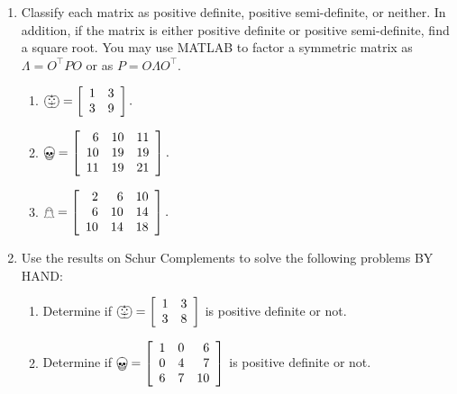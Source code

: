 \documentclass[letterpaper]{article}
\begin{document}
\begin{enumerate}


\item Classify each matrix as positive definite, positive semi-definite, or neither. In addition, if the matrix is either positive definite or positive semi-definite, find a square root. You may use MATLAB to factor a symmetric matrix as $\Lambda = O^\top P O$ or as $P= O \Lambda O ^\top$.

\begin{enumerate}
\setlength{\itemsep}{.1in}
\renewcommand{\labelenumi}{(\alph{enumi})}

\item $\greatpumpkin= \left[ \begin{array}{rr}  1&   3\\  3&   9\end{array} \right].$

\item  $\bigskull= \left[ \begin{array}{rrr}  6&  10&  11\\ 10&  19&  19\\ 11&  19&  21\end{array} \right].$

\item $\mathghost=  \left[ \begin{array}{rrr}  2&   6&  10\\  6&  10&  14\\ 10&  14&  18\end{array} \right].$

\end{enumerate}


\item Use the results on Schur Complements  to solve  the following problems BY HAND:

        \begin{enumerate}
\setlength{\itemsep}{.1in}
\renewcommand{\labelenumi}{(\alph{enumi})}

\item  Determine if  $\greatpumpkin= \left[ \begin{array}{rr}  1&   3\\  3&   8\end{array} \right]$ is positive definite or not.

\item  Determine if  $\bigskull= \left[ \begin{array}{rrr}  1&   0&  6\\  0&  4&   7\\  6&   7&  10\end{array} \right]$ is positive definite or not.


\end{enumerate}
\end{enumerate}
\end{document}
